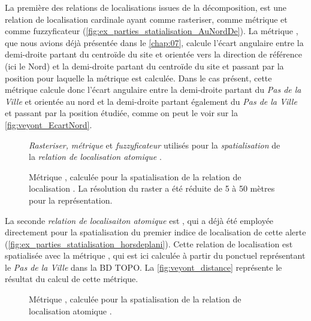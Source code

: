 La première des relations de localisations issues de la décomposition,
 est une relation de localisation cardinale
ayant  comme rasteriser,
 comme métrique et 
comme fuzzyficateur
(\autoref{fig:ex_parties_statialisation_AuNordDe}). La métrique
, que nous avions déjà présentée dans le
\autoref{chap:07}, calcule l'écart angulaire entre la demi-droite
partant du centroïde du site et orientée vers la direction de
référence (ici le Nord) et la demi-droite partant du centroïde du site
et passant par la position pour laquelle la métrique est
calculée. Dans le cas présent, cette métrique calcule donc l'écart
angulaire entre la demi-droite partant du \emph{Pas de la Ville} et
orientée au nord et la demi-droite partant également du \emph{Pas de
  la Ville} et passant par la position étudiée, comme on peut le voir
sur la \autoref{fig:veyont_EcartNord}.

\begin{figure}
  \centering
  
  \caption{\emph{Rasteriser,} \emph{métrique} et \emph{fuzzyficateur}
    utilisés pour la \emph{spatialisation} de la \emph{relation de
      localisation atomique} \protect{}.}
  \label{fig:ex_parties_statialisation_AuNordDe}
\end{figure}



\begin{figure}
  \centering
  
  \caption{Métrique \protect{}, calculée
    pour la spatialisation de la relation de localisation
    \protect{}. La résolution du raster a
    été réduite de 5 à 50 mètres pour la représentation.}
  \label{fig:veyont_EcartNord}
\end{figure}

La seconde \emph{relation de localisaiton atomique} est
, qui a déjà été employée
directement pour la spatialisation du premier indice de localisation
de cette alerte
(\autoref{fig:ex_parties_statialisation_horsdeplani}). Cette relation
de localisation est spatialisée avec la métrique
, qui est ici calculée à partir du ponctuel
représentant le \emph{Pas de la Ville} dans la BD TOPO. La
\autoref{fig:veyont_distance} représente le résultat du calcul de
cette métrique.

\begin{figure}
  \centering
  
  \caption{Métrique \protect{}, calculée pour la
    spatialisation de la relation de localisation atomique
    \protect{}.}
  \label{fig:veyont_distance}
\end{figure}

